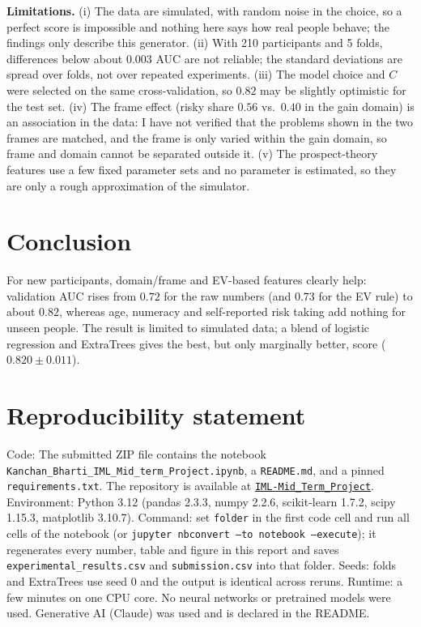\documentclass[11pt,a4paper]{article}
\begin{document}
\textbf{Limitations.} (i) The data are simulated, with random noise in the choice, so a perfect score is impossible and
nothing here says how real people behave; the findings only describe this generator. (ii) With 210 participants and
5 folds, differences below about $0.003$ AUC are not reliable; the standard deviations are spread over folds, not over
repeated experiments. (iii) The model choice and $C$ were selected on the same cross-validation, so $0.82$ may be
slightly optimistic for the test set. (iv) The frame effect (risky share $0.56$ vs.\ $0.40$ in the gain domain) is an
association in the data: I have not verified that the problems shown in the two frames are matched, and the frame is
only varied within the gain domain, so frame and domain cannot be separated outside it. (v) The prospect-theory features
use a few fixed parameter sets and no parameter is estimated, so they are only a rough approximation of the simulator.

\section{Conclusion}
For new participants, domain/frame and EV-based features clearly help: validation AUC rises from $0.72$ for the raw numbers
(and $0.73$ for the EV rule) to about $0.82$, whereas age, numeracy and self-reported risk taking add nothing for unseen
people. The result is limited to simulated data; a blend of logistic regression and ExtraTrees gives the best, but only marginally
better, score ($0.820\pm0.011$).

\section*{Reproducibility statement}
Code: The submitted ZIP file contains the notebook \texttt{Kanchan\_Bharti\_IML\_Mid\_term\_Project.ipynb}, a \texttt{README.md}, and a pinned \texttt{requirements.txt}. The repository is available at \href{https://github.com/Kanchan039/IML-2026-Track-B-Risky-Choice}{\texttt{IML-Mid\_Term\_Project}}.
Environment: Python 3.12 (pandas 2.3.3, numpy 2.2.6, scikit-learn 1.7.2, scipy 1.15.3, matplotlib 3.10.7).
Command: set \texttt{folder} in the first code cell and run all cells of the notebook (or \texttt{jupyter nbconvert --to notebook --execute}); it regenerates every number, table and figure in this report and saves \texttt{experimental\_results.csv} and \texttt{submission.csv} into that folder.
Seeds: folds and ExtraTrees use seed 0 and the output is identical across reruns. Runtime: a few minutes on one CPU core.
No neural networks or pretrained models were used. Generative AI (Claude) was used and is declared in the README.
\end{document}
